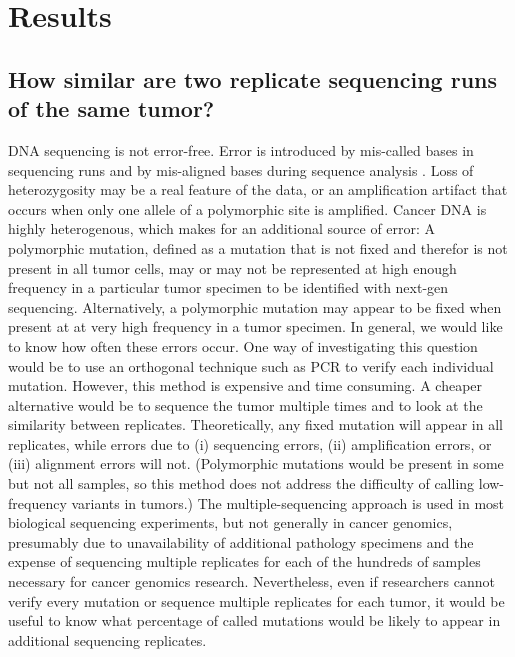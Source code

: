 \documentclass[11 pt]{article} %
\begin{document}
\section*{Results}

\subsection*{How similar are two replicate sequencing runs of the same tumor?}


DNA sequencing is not error-free. Error is introduced by mis-called bases in sequencing runs and by mis-aligned bases during sequence analysis \citep{seqerror}. Loss of heterozygosity may be a real feature of the data, or an amplification artifact that occurs when only one allele of a polymorphic site is amplified. Cancer DNA is highly heterogenous, which makes for an additional source of error: A polymorphic mutation, defined as a mutation that is not fixed and therefor is not present in all tumor cells, may or may not be represented at high enough frequency in a particular tumor specimen to be identified with next-gen sequencing. Alternatively, a polymorphic mutation may appear to be fixed when present at at very high frequency in a tumor specimen. In general, we would like to know how often these errors occur. One way of investigating this question would be to use an orthogonal technique such as PCR to verify each individual mutation. However, this method is expensive and time consuming. A cheaper alternative would be to sequence the tumor multiple times and to look at the similarity between replicates. Theoretically, any fixed mutation will appear in all replicates, while errors due to (i) sequencing errors, (ii) amplification errors, or (iii) alignment errors will not. (Polymorphic mutations would be present in some but not all samples, so this method does not address the difficulty of calling low-frequency variants in tumors.) The multiple-sequencing approach is used in most biological sequencing experiments, but not generally in cancer genomics, presumably due to unavailability of additional pathology specimens and the expense of sequencing multiple replicates for each of the hundreds of samples necessary for cancer genomics research. Nevertheless, even if researchers cannot verify every mutation or sequence multiple replicates for each tumor, it would be useful to know what percentage of called mutations would be likely to appear in additional sequencing replicates.
\end{document}
